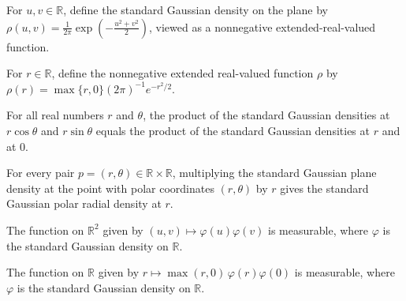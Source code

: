 \begin{definition}
\label{FABL.standardGaussianPlaneDensity}
\leanok
For $u,v\in\mathbb{R}$, define the standard Gaussian density on the plane by
$\rho(u,v)=\frac{1}{2\pi}\exp\!\left(-\frac{u^2+v^2}{2}\right)$, viewed as a nonnegative
extended-real-valued function.
\end{definition}

\begin{definition}
\label{FABL.standardGaussianPolarRadialDensity}
\leanok
For $r\in\mathbb{R}$, define the nonnegative extended real-valued function $\rho$ by
$\rho(r)=\max\{r,0\}(2\pi)^{-1}e^{-r^2/2}$.
\end{definition}

\begin{theorem}
\label{FABL.gaussianPDF_mul_polar}
\leanok
{}
For all real numbers $r$ and $\theta$, the product of the standard Gaussian densities at
$r\cos\theta$ and $r\sin\theta$ equals the product of the standard Gaussian densities at
$r$ and at $0$.
\end{theorem}

\begin{theorem}
\label{FABL.standardGaussianPlaneDensity_polar}
\leanok
{}
For every pair $p=(r,\theta)\in\mathbb{R}\times\mathbb{R}$, multiplying the standard
Gaussian plane density at the point with polar coordinates $(r,\theta)$ by $r$ gives the
standard Gaussian polar radial density at $r$.
\end{theorem}

\begin{theorem}
\label{FABL.measurable_standardGaussianPlaneDensity}
\leanok
{}
The function on $\mathbb{R}^2$ given by $(u,v)\mapsto \varphi(u)\varphi(v)$ is
measurable, where $\varphi$ is the standard Gaussian density on $\mathbb{R}$.
\end{theorem}

\begin{theorem}
\label{FABL.measurable_standardGaussianPolarRadialDensity}
\leanok
{}
The function on $\mathbb{R}$ given by $r\mapsto \max(r,0)\,\varphi(r)\varphi(0)$ is
measurable, where $\varphi$ is the standard Gaussian density on $\mathbb{R}$.
\end{theorem}

